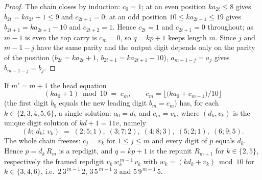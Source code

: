 \begin{proof}
The chain closes by induction: $c_0 = 1$; at an even
position $k a_{2t} \le 8$ gives $b_{2t} = k a_{2t} + 1 \le
9$ and $c_{2t+1} = 0$; at an odd position
$10 \le k a_{2t+1} \le 19$ gives $b_{2t+1} = k a_{2t+1} -
10$ and $c_{2t+2} = 1$. Hence $c_{2t} = 1$ and
$c_{2t+1} = 0$ throughout; as $m-1$ is even the top carry
is $c_m = 0$, so $q = kp+1$ keeps length $m$. Since $j$
and $m-1-j$ have the same parity and the output digit
depends only on the parity of the position
($b_{2t} = k a_{2t} + 1$, $b_{2t+1} = k a_{2t+1} - 10$),
$a_{m-1-j} = a_j$ gives $b_{m-1-j} = b_j$.
\end{proof}

\begin{lemma}
\label{lem:overflow}
If $m' = m+1$ the head equation
\begin{equation}
 (k a_0 + 1) \bmod 10 \;=\; c_m ,
 \qquad c_m = \bigl\lfloor\bigl(k a_0 + c_{m-1}\bigr)\big/10
 \bigr\rfloor
 \label{eq:head}
\end{equation}
(the first digit $b_0$ equals the new leading digit
$b_m = c_m$) has, for each $k \in \{2,3,4,5,6\}$, a single
solution: $a_0 = d_k$ and $c_m = v_k$, where $(d_k, v_k)$
is the unique digit solution of $k d + 1 = 11 v$, namely
\[
 (k;\,d_k;\,v_k) \;=\;
 (2;5;1),\; (3;7;2),\; (4;8;3),\; (5;2;1),\; (6;9;5) .
\]
The whole chain freezes: $c_j = v_k$ for $1 \le j \le m$
and every digit of $p$ equals $d_k$. Hence $p = d_k\,R_m$
is a repdigit, and $q = kp+1$ is the repunit $R_{m+1}$
for $k \in \{2,5\}$, respectively the framed repdigit
$v_k\,w_k^{\,m-1}\,v_k$ with
$w_k = (k d_k + v_k) \bmod 10$ for $k \in \{3,4,6\}$,
i.e.\ $2\,3^{\,m-1}\,2$, $3\,5^{\,m-1}\,3$ and
$5\,9^{\,m-1}\,5$.
\end{lemma}


